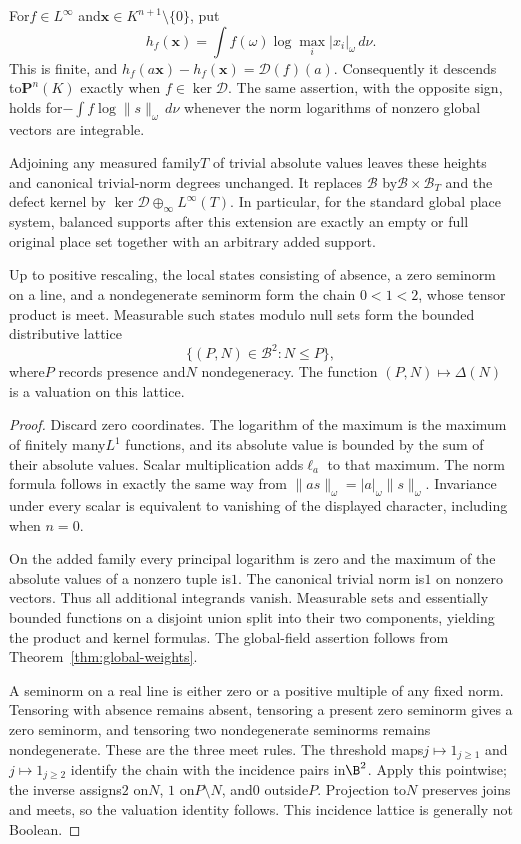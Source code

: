 \begin{proposition}
\label{prop:height-neutrality}
For$f\in L^\infty$ and$\mathbf x\in K^{n+1}\setminus\{0\}$, put
\[
 h_f(\mathbf x)=\int f(\omega)\log\max_i|x_i|_\omega\,d\nu.
\]
This is finite, and
$h_f(a\mathbf x)-h_f(\mathbf x)=\mathcal D(f)(a)$.
Consequently it descends to$\mathbf P^n(K)$ exactly when
$f\in\ker\mathcal D$. The same assertion, with the opposite sign,
holds for$-\int f\log\|s\|_\omega\,d\nu$ whenever the norm logarithms
of nonzero global vectors are integrable.

Adjoining any measured family$T$ of trivial absolute values leaves these
heights and canonical trivial-norm degrees unchanged. It replaces
$\mathscr B$ by$\mathscr B\times\mathscr B_T$ and the defect kernel by
$\ker\mathcal D\oplus_\infty L^\infty(T)$. In particular, for the standard
global place system, balanced supports after this extension are exactly
an empty or full original place set together with an arbitrary added
support.

Up to positive rescaling, the local states consisting of absence, a zero
seminorm on a line, and a nondegenerate seminorm form the chain
$0<1<2$, whose tensor product is meet. Measurable such states modulo null
sets form the bounded distributive lattice
\[
 \{(P,N)\in\mathscr B^2:N\le P\},
\]
where$P$ records presence and$N$ nondegeneracy. The function
$(P,N)\mapsto\Delta(N)$ is a valuation on this lattice.
\end{proposition}
\begin{proof}
Discard zero coordinates. The logarithm of the maximum is the maximum of
finitely many$L^1$ functions, and its absolute value is bounded by the sum
of their absolute values. Scalar multiplication adds$\ell_a$ to that
maximum. The norm formula follows in exactly the same way from
$\|as\|_\omega=|a|_\omega\|s\|_\omega$. Invariance under every scalar
is equivalent to vanishing of the displayed character, including when
$n=0$.

On the added family every principal logarithm is zero and the maximum
of the absolute values of a nonzero tuple is$1$. The canonical trivial
norm is$1$ on nonzero vectors. Thus all additional integrands vanish.
Measurable sets and essentially bounded functions on a disjoint union
split into their two components, yielding the product and kernel formulas.
The global-field assertion follows from Theorem~\ref{thm:global-weights}.

A seminorm on a real line is either zero or a positive multiple of any
fixed norm. Tensoring with absence remains absent, tensoring a present
zero seminorm gives a zero seminorm, and tensoring two nondegenerate
seminorms remains nondegenerate. These are the three meet rules. The
threshold maps$j\mapsto1_{j\ge1}$ and$j\mapsto1_{j\ge2}$ identify the
chain with the incidence pairs in$\B^2$. Apply this pointwise; the inverse
assigns$2$ on$N$, $1$ on$P\setminus N$, and$0$ outside$P$. Projection to$N$
preserves joins and meets, so the valuation identity follows. This
incidence lattice is generally not Boolean.
\end{proof}

